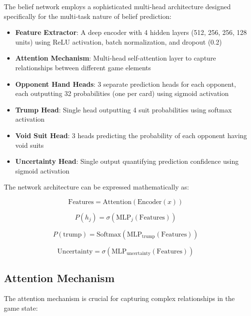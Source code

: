 \documentclass[conference]{IEEEtran}
\begin{document}
The belief network employs a sophisticated multi-head architecture designed specifically for the multi-task nature of belief prediction:

\begin{itemize}
    \item \textbf{Feature Extractor}: A deep encoder with 4 hidden layers (512, 256, 256, 128 units) using ReLU activation, batch normalization, and dropout (0.2)
    \item \textbf{Attention Mechanism}: Multi-head self-attention layer to capture relationships between different game elements
    \item \textbf{Opponent Hand Heads}: 3 separate prediction heads for each opponent, each outputting 32 probabilities (one per card) using sigmoid activation
    \item \textbf{Trump Head}: Single head outputting 4 suit probabilities using softmax activation
    \item \textbf{Void Suit Head}: 3 heads predicting the probability of each opponent having void suits
    \item \textbf{Uncertainty Head}: Single output quantifying prediction confidence using sigmoid activation
\end{itemize}

The network architecture can be expressed mathematically as:

\begin{equation}
\text{Features} = \text{Attention}(\text{Encoder}(x))
\end{equation}

\begin{equation}
P(h_j) = \sigma(\text{MLP}_j(\text{Features}))
\end{equation}

\begin{equation}
P(\text{trump}) = \text{Softmax}(\text{MLP}_{\text{trump}}(\text{Features}))
\end{equation}

\begin{equation}
\text{Uncertainty} = \sigma(\text{MLP}_{\text{uncertainty}}(\text{Features}))
\end{equation}

\subsection{Attention Mechanism}

The attention mechanism is crucial for capturing complex relationships in the game state:
\end{document}

